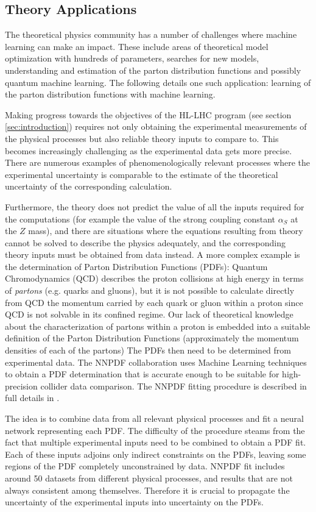 \subsection{Theory Applications}

The theoretical physics community has a number of challenges where machine learning can make an impact. These include areas of theoretical model optimization with hundreds of parameters, searches for new models,  understanding and estimation of the parton distribution functions and possibly quantum machine learning. The following details one such application: learning of the parton distribution functions with machine learning.

Making progress towards the objectives of the HL-LHC program (see section \ref{sec:introduction}) requires not only
obtaining the experimental measurements of the physical processes but also reliable theory inputs to compare to. This becomes increasingly challenging as the experimental data gets more precise. There are numerous examples of phenomenologically relevant processes where the experimental uncertainty is comparable to the estimate of the theoretical uncertainty of the corresponding calculation.

Furthermore, the theory does not predict the value of all the inputs required for the computations (for example the
value of the strong coupling constant $\alpha_S$ at the $Z$ mass), and there are situations where the equations
resulting from theory cannot be solved to describe the physics adequately, and the corresponding theory inputs must be obtained from data instead. A more complex example is the determination of Parton Distribution Functions (PDFs): Quantum Chromodynamics (QCD) describes the proton collisions at high energy in terms of \emph{partons} (e.g. quarks and gluons), but it is not possible to calculate directly from QCD the momentum carried by each quark or gluon within a proton since QCD is not solvable in its confined regime. Our lack of theoretical knowledge about the characterization of
partons within a proton is embedded into a suitable definition of the Parton Distribution Functions (approximately the momentum densities of each of the partons) The PDFs then need to be determined from experimental data. The NNPDF collaboration uses Machine Learning techniques to obtain a PDF determination that is accurate enough to be suitable for high-precision collider data comparison. The NNPDF fitting procedure is described in full details in \cite{Ball:2014uwa}.

The idea is to combine data from all relevant physical processes and fit a neural network representing each PDF. The difficulty of the procedure steams from the fact that multiple experimental inputs need to be combined to obtain
a PDF fit. Each of these inputs adjoins only indirect constraints on the PDFs, leaving some regions of the PDF
completely unconstrained by data. NNPDF fit includes around 50 datasets from different physical processes, and results that are not always consistent among themselves. Therefore it is crucial to propagate the uncertainty of the experimental inputs into uncertainty on the PDFs.

